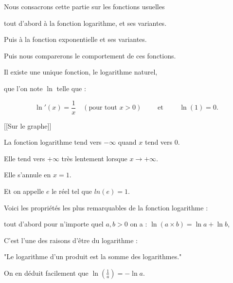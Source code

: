 







\debuttexte

\diapo

\change

Nous consacrons cette partie sur les fonctions usuelles 

\change

tout d'abord à la fonction logarithme, et ses variantes.

\change

Puis à la fonction exponentielle et ses variantes.

\change

Puis nous comparerons le comportement de ces fonctions.


\diapo

Il existe une unique fonction, le logarithme naturel,

que l'on note $\ln$ telle que :

$$\ln'(x) = \frac 1x \quad (\text{pour tout } x>0) \qquad \text { et } \qquad \ln(1) = 0.$$

[[Sur le graphe]]


La fonction logarithme tend vers $-\infty$ quand $x$ tend vers $0$.

Elle tend vers $+\infty$ très lentement lorsque $x\to +\infty$.

Elle s'annule en $x=1$.

Et on appelle $e$ le réel tel que $ln(e)=1$.



\diapo

Voici les propriétés les plus remarquables de la fonction logarithme :

tout d'abord pour n'importe quel $a,b>0$
on a : $\ln (a \times b) = \ln a + \ln b$,

C'est l'une des raisons d'être du logarithme :

"Le logarithme d'un produit est la somme des logarithmes."


\change

On en déduit facilement que
$\ln(\frac 1 a) = - \ln a$.


